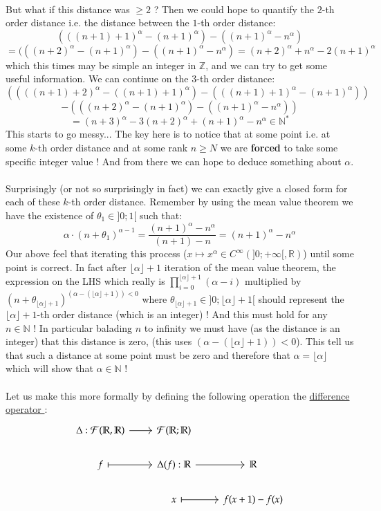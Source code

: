 \documentclass[11pt, a4paper, oneside]{article}
\theoremstyle{remark}
\theoremstyle{lemma}
\begin{document}
\\
But what if this distance was $\geq 2$ ? Then we could hope to quantify the $2$-th order distance i.e. the distance between the $1$-th order distance:
$$(((n+1)+1)^{\alpha}-(n+1)^{\alpha})-((n+1)^{\alpha}-n^{\alpha})$$
$$=(((n+2)^{\alpha}-(n+1)^{\alpha})-((n+1)^{\alpha}-n^{\alpha})=(n+2)^{\alpha}+n^{\alpha}-2(n+1)^{\alpha}$$
which this times may be simple an integer in $\mathbb{Z}$, and we can try to get some useful information. We can continue on the $3$-th order distance:
$$\left((((n+1)+2)^{\alpha}-((n+1)+1)^{\alpha})-(((n+1)+1)^{\alpha}-(n+1)^{\alpha})\right)$$
$$-\left(((n+2)^{\alpha}-(n+1)^{\alpha})-((n+1)^{\alpha}-n^{\alpha})\right)$$
$$=(n+3)^{\alpha}-3(n+2)^{\alpha}+(n+1)^{\alpha}-n^{\alpha}\in\mathbb{N}^{*}$$
This starts to go messy...
The key here is to notice that at some point i.e. at some $k$-th order distance and at some rank $n\geq N$ we are \textbf{forced} to take some specific integer value ! And from there we can hope to deduce something about $\alpha$.
\\\\
Surprisingly (or not so surprisingly in fact) we can exactly give a closed form for each of these $k$-th order distance. Remember by using the mean value theorem we have the existence of $\theta_{1}\in]0;1[$ such that:
$$\alpha\cdot (n+\theta_1)^{\alpha-1}=\frac{(n+1)^{\alpha}-n^{\alpha}}{(n+1)-n}=(n+1)^{\alpha}-n^{\alpha}$$
Our above feel that iterating this process ($x\mapsto x^{\alpha}\in C^{\infty}(]0;+\infty[,\mathbb{R})$) until some point is correct. In fact after $\lfloor\alpha\rfloor+1$ iteration of the mean value theorem, the expression on the LHS which really is  $\prod_{i=0}^{\lfloor\alpha\rfloor+1}(\alpha-i)$ multiplied by $(n+\theta_{\lfloor\alpha\rfloor+1})^{(\alpha-(\lfloor\alpha\rfloor+1))<0}$ where $\theta_{\lfloor\alpha\rfloor+1}\in]0;\lfloor\alpha\rfloor+1[$ should represent the $\lfloor\alpha\rfloor+1$-th order distance (which is an integer) ! And this must hold for any $n\in\mathbb{N}$ ! In particular balading $n$ to infinity we must have (as the distance is an integer) that this distance is zero, (this uses $(\alpha-(\lfloor\alpha\rfloor+1))<0$).  This tell us that such a distance at some point must be zero and therefore that $\alpha=\lfloor\alpha\rfloor$ which will show that $\alpha\in\mathbb{N}$ !
\\\\
Let us make this more formally by defining the following operation the \href{https://en.m.wikipedia.org/wiki/Finite_difference}{difference operator }:
\[\begin{tikzcd}
	{\Delta:\mathcal{F}(\mathbb{R},\mathbb{R})} & {\mathcal{F}(\mathbb{R};\mathbb{R})} \\
	f & {\Delta(f):\mathbb{R}} & {\mathbb{R}} \\
	& x & {f(x+1)-f(x)}
	\arrow[from=1-1, to=1-2]
	\arrow[maps to, from=2-1, to=2-2]
	\arrow[from=2-2, to=2-3]
	\arrow[maps to, from=3-2, to=3-3]
\end{tikzcd}\]
\end{document}
